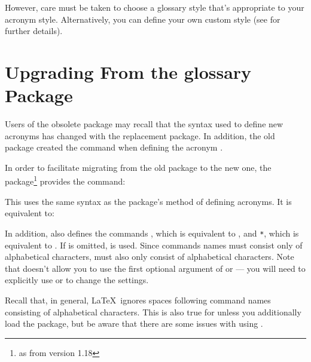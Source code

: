 \documentclass[report,inlinetitle]{nlctdoc}
\begin{document}
However, care must be taken to choose a glossary style that's
appropriate to your acronym style.
Alternatively, you can define your own custom style (see 
 for further details).

\section{Upgrading From the glossary Package}
\label{sec:oldacronym}

Users of the obsolete  package may recall that
the syntax used to define new acronyms has changed with the
replacement  package. In addition, the old
 package created the command 
\cs{} when defining the acronym .

In order to facilitate migrating from the old package to the new
one, the  package\footnote{as from version 1.18} 
provides the command:
\begin{definition}[\DescribeMacro{\oldacronym}]
\end{definition}
This uses the same syntax as the  package's
method of defining acronyms. It is equivalent to:
\begin{display}
\end{display}
In addition,  also defines the commands
\cs{}, which is equivalent to ,
and \cs{}\texttt{*}, which is equivalent to
. If  is omitted, 
is used. Since commands names must consist only of alphabetical
characters,  must also only consist of alphabetical
characters. Note that \cs{} doesn't allow you to use
the first optional argument of  or  --- you will
need to explicitly use  or  to change the
settings.

\begin{important}
Recall that, in general, \LaTeX\ ignores spaces following command 
names consisting of alphabetical characters. This is also true for 
\cs{} unless you additionally load the
 package, but be aware that there are some issues with
using .\footnotemark
\end{important}
\end{document}
